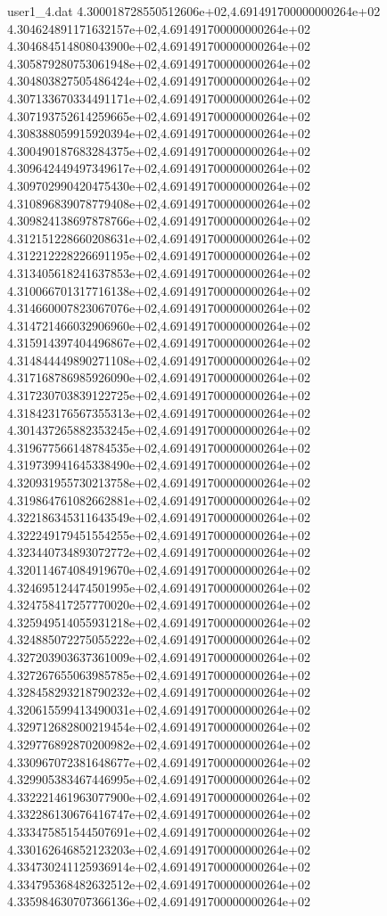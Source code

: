 \begin{filecontents}{user1_4.dat}
4.300018728550512606e+02,4.691491700000000264e+02
4.304624891171632157e+02,4.691491700000000264e+02
4.304684514808043900e+02,4.691491700000000264e+02
4.305879280753061948e+02,4.691491700000000264e+02
4.304803827505486424e+02,4.691491700000000264e+02
4.307133670334491171e+02,4.691491700000000264e+02
4.307193752614259665e+02,4.691491700000000264e+02
4.308388059915920394e+02,4.691491700000000264e+02
4.300490187683284375e+02,4.691491700000000264e+02
4.309642449497349617e+02,4.691491700000000264e+02
4.309702990420475430e+02,4.691491700000000264e+02
4.310896839078779408e+02,4.691491700000000264e+02
4.309824138697878766e+02,4.691491700000000264e+02
4.312151228660208631e+02,4.691491700000000264e+02
4.312212228226691195e+02,4.691491700000000264e+02
4.313405618241637853e+02,4.691491700000000264e+02
4.310066701317716138e+02,4.691491700000000264e+02
4.314660007823067076e+02,4.691491700000000264e+02
4.314721466032906960e+02,4.691491700000000264e+02
4.315914397404496867e+02,4.691491700000000264e+02
4.314844449890271108e+02,4.691491700000000264e+02
4.317168786985926090e+02,4.691491700000000264e+02
4.317230703839122725e+02,4.691491700000000264e+02
4.318423176567355313e+02,4.691491700000000264e+02
4.301437265882353245e+02,4.691491700000000264e+02
4.319677566148784535e+02,4.691491700000000264e+02
4.319739941645338490e+02,4.691491700000000264e+02
4.320931955730213758e+02,4.691491700000000264e+02
4.319864761082662881e+02,4.691491700000000264e+02
4.322186345311643549e+02,4.691491700000000264e+02
4.322249179451554255e+02,4.691491700000000264e+02
4.323440734893072772e+02,4.691491700000000264e+02
4.320114674084919670e+02,4.691491700000000264e+02
4.324695124474501995e+02,4.691491700000000264e+02
4.324758417257770020e+02,4.691491700000000264e+02
4.325949514055931218e+02,4.691491700000000264e+02
4.324885072275055222e+02,4.691491700000000264e+02
4.327203903637361009e+02,4.691491700000000264e+02
4.327267655063985785e+02,4.691491700000000264e+02
4.328458293218790232e+02,4.691491700000000264e+02
4.320615599413490031e+02,4.691491700000000264e+02
4.329712682800219454e+02,4.691491700000000264e+02
4.329776892870200982e+02,4.691491700000000264e+02
4.330967072381648677e+02,4.691491700000000264e+02
4.329905383467446995e+02,4.691491700000000264e+02
4.332221461963077900e+02,4.691491700000000264e+02
4.332286130676416747e+02,4.691491700000000264e+02
4.333475851544507691e+02,4.691491700000000264e+02
4.330162646852123203e+02,4.691491700000000264e+02
4.334730241125936914e+02,4.691491700000000264e+02
4.334795368482632512e+02,4.691491700000000264e+02
4.335984630707366136e+02,4.691491700000000264e+02

\end{filecontents}
